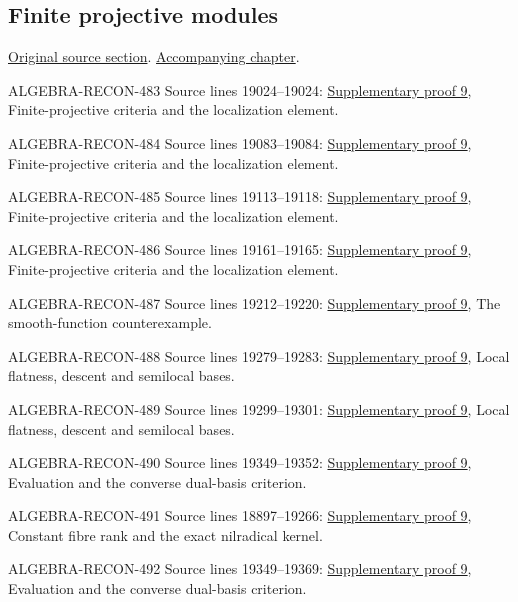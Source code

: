 \subsection{Finite projective modules}
\hypertarget{algebra-source-section-finite-projective-modules}{}
\noindent\href{https://github.com/stacks/stacks-project/blob/a04446e57ec1fbc252a871afcec7752fb2807b14/algebra.tex\#L19000}{Original source section}. \href{algebra.pdf\#nameddest=section-finite-projective-modules}{Accompanying chapter}.

\begin{AlgebraSourceRoutes}
\item[ALGEBRA-RECON-483] Source lines 19024--19024: \hyperlink{algebra_projective_lifting_notes_20260927}{Supplementary proof 9}, Finite-projective criteria and the localization element.
\item[ALGEBRA-RECON-484] Source lines 19083--19084: \hyperlink{algebra_projective_lifting_notes_20260927}{Supplementary proof 9}, Finite-projective criteria and the localization element.
\item[ALGEBRA-RECON-485] Source lines 19113--19118: \hyperlink{algebra_projective_lifting_notes_20260927}{Supplementary proof 9}, Finite-projective criteria and the localization element.
\item[ALGEBRA-RECON-486] Source lines 19161--19165: \hyperlink{algebra_projective_lifting_notes_20260927}{Supplementary proof 9}, Finite-projective criteria and the localization element.
\item[ALGEBRA-RECON-487] Source lines 19212--19220: \hyperlink{algebra_projective_lifting_notes_20260927}{Supplementary proof 9}, The smooth-function counterexample.
\item[ALGEBRA-RECON-488] Source lines 19279--19283: \hyperlink{algebra_projective_lifting_notes_20260927}{Supplementary proof 9}, Local flatness, descent and semilocal bases.
\item[ALGEBRA-RECON-489] Source lines 19299--19301: \hyperlink{algebra_projective_lifting_notes_20260927}{Supplementary proof 9}, Local flatness, descent and semilocal bases.
\item[ALGEBRA-RECON-490] Source lines 19349--19352: \hyperlink{algebra_projective_lifting_notes_20260927}{Supplementary proof 9}, Evaluation and the converse dual-basis criterion.
\item[ALGEBRA-RECON-491] Source lines 18897--19266: \hyperlink{algebra_projective_lifting_notes_20260927}{Supplementary proof 9}, Constant fibre rank and the exact nilradical kernel.
\item[ALGEBRA-RECON-492] Source lines 19349--19369: \hyperlink{algebra_projective_lifting_notes_20260927}{Supplementary proof 9}, Evaluation and the converse dual-basis criterion.
\end{AlgebraSourceRoutes}

